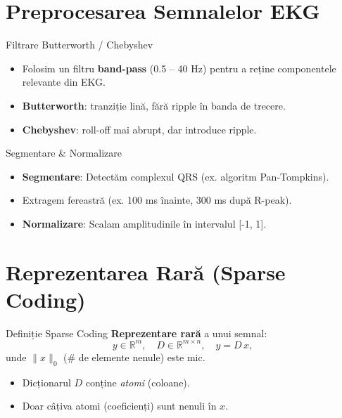 \documentclass[aspectratio=169,xcolor=dvipsnames]{beamer}
\begin{document}
\section{Preprocesarea Semnalelor EKG}

\begin{frame}{Filtrare Butterworth / Chebyshev}
  \begin{itemize}
    \item Folosim un filtru \textbf{band-pass} (0.5 -- 40 Hz) pentru a reține componentele relevante din EKG.
    \item \textbf{Butterworth}: tranziție lină, fără ripple în banda de trecere.
    \item \textbf{Chebyshev}: roll-off mai abrupt, dar introduce ripple.
  \end{itemize}
\end{frame}

\begin{frame}{Segmentare \& Normalizare}
  \begin{itemize}
    \item \textbf{Segmentare}: Detectăm complexul QRS (ex. algoritm Pan-Tompkins).
    \item Extragem fereastră (ex. 100 ms înainte, 300 ms după R-peak).
    \item \textbf{Normalizare}: Scalam amplitudinile în intervalul [-1, 1].
  \end{itemize}
\end{frame}

\section{Reprezentarea Rară (Sparse Coding)}

\begin{frame}{Definiție Sparse Coding}
  \textbf{Reprezentare rară} a unui semnal:
  \[
    y \in \mathbb{R}^m,\quad 
    D \in \mathbb{R}^{m \times n}, \quad
    y = D\,x,
  \]
  unde \(\| x \|_0\) (\# de elemente nenule) este mic. 

  \begin{itemize}
    \item Dicționarul \(D\) conține \emph{atomi} (coloane).
    \item Doar câțiva atomi (coeficienți) sunt nenuli în \(x\).
  \end{itemize}
\end{frame}
\end{document}
